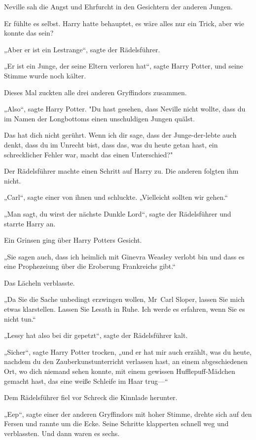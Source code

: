 {Neville sah die Angst und Ehrfurcht in den Gesichtern der anderen Jungen.

Er fühlte es selbst. Harry hatte behauptet, es wäre alles nur ein Trick, aber wie konnte das sein?

„Aber er ist ein Lestrange“, sagte der Rädelsführer.

„Er ist ein Junge, der seine Eltern verloren hat“, sagte Harry Potter, und seine Stimme wurde noch kälter.

Dieses Mal zuckten alle drei anderen Gryffindors zusammen.

„Also“, sagte Harry Potter. "Du hast gesehen, dass Neville nicht wollte, dass du im Namen der Longbottoms einen unschuldigen Jungen quälst.

Das hat dich nicht gerührt. Wenn ich dir sage, dass der Junge-der-lebte auch denkt, dass du im Unrecht bist, dass das, was du heute getan hast, ein schrecklicher Fehler war, macht das einen Unterschied?"

Der Rädelsführer machte einen Schritt auf Harry zu. Die anderen folgten ihm nicht.

„Carl“, sagte einer von ihnen und schluckte. „Vielleicht sollten wir gehen.“

„Man sagt, du wirst der nächste Dunkle Lord“, sagte der Rädelsführer und starrte Harry an.

Ein Grinsen ging über Harry Potters Gesicht.

„Sie sagen auch, dass ich heimlich mit Ginevra Weasley verlobt bin und dass es eine Prophezeiung über die Eroberung Frankreichs gibt.“

Das Lächeln verblasste.

„Da Sie die Sache unbedingt erzwingen wollen, Mr~Carl Sloper, lassen Sie mich etwas klarstellen. Lassen Sie Lesath in Ruhe. Ich werde es erfahren, wenn Sie es nicht tun.“

„Lessy hat also bei dir gepetzt“, sagte der Rädelsführer kalt.

„Sicher“, sagte Harry Potter trocken, „und er hat mir auch erzählt, was du heute, nachdem du den Zauberkunstunterricht verlassen hast, an einem abgeschiedenen Ort, wo dich niemand sehen konnte, mit einem gewissen Hufflepuff-Mädchen gemacht hast, das eine weiße Schleife im Haar trug—“

Dem Rädelsführer fiel vor Schreck die Kinnlade herunter.

„Eep“, sagte einer der anderen Gryffindors mit hoher Stimme, drehte sich auf den Fersen und rannte um die Ecke. Seine Schritte klapperten schnell weg und verblassten. Und dann waren es sechs.

}
